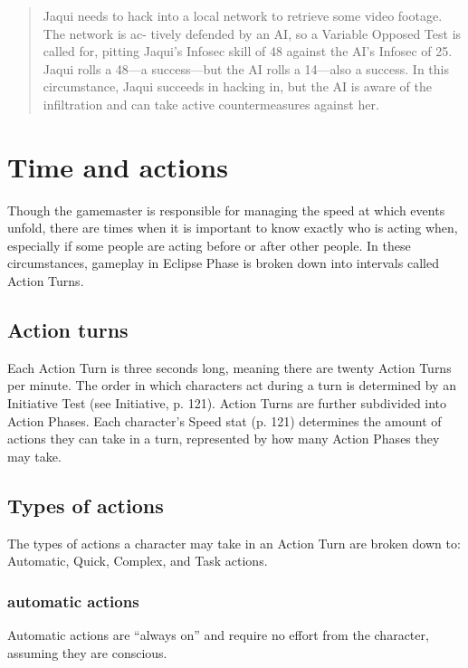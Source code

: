 \begin{quotation}
Jaqui needs to hack into a local network to retrieve some video footage. The network is ac- tively defended by an AI, so a Variable Opposed Test is called for, pitting Jaqui's Infosec skill of 48 against the AI's Infosec of 25. Jaqui rolls a 48—a success—but the AI rolls a 14—also a success. In this circumstance, Jaqui succeeds in hacking in, but the AI is aware of the infiltration and can take active countermeasures against her.
\end{quotation}

\section{Time and actions}
\label{sec:time-actions}

Though the gamemaster is responsible for managing the speed at which events unfold, there are times when it is important to know exactly who is acting when, especially if some people are acting before or after other people. In these circumstances, gameplay in Eclipse Phase is broken down into intervals called Action Turns.

\subsection{Action turns}
\label{sec:action-turns}

Each Action Turn is three seconds long, meaning there are twenty Action Turns per minute. The order in which characters act during a turn is determined by an Initiative Test (see Initiative, p. 121). Action Turns are further subdivided into Action Phases. Each character's Speed stat (p. 121) determines the amount of actions they can take in a turn, represented by how many Action Phases they may take.

\subsection{Types of actions}
\label{sec:types-actions}

The types of actions a character may take in an Action Turn are broken down to: Automatic, Quick, Complex, and Task actions.

\subsubsection{automatic actions}
\label{sec:automatic-actions}

Automatic actions are “always on” and require no effort from the character, assuming they are conscious.

